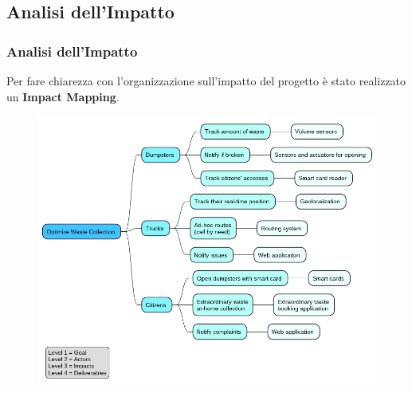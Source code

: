 \subsection{Analisi dell'Impatto}

\begin{frame}
    \frametitle{Analisi dell'Impatto}
    Per fare chiarezza con l'organizzazione sull'impatto del progetto è stato realizzato un \textbf{Impact Mapping}.

    \smallskip

    \begin{figure}[H]
        \centering
        \includegraphics[width=0.7\linewidth]{../img/impact-mapping}
    \end{figure}

\end{frame}
